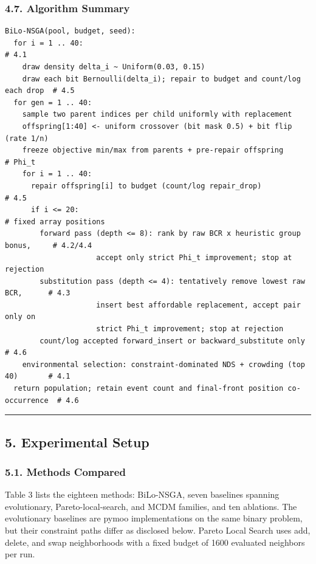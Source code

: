 \documentclass[
]{article}
\begin{document}
\subsubsection{4.7. Algorithm Summary}\label{algorithm-summary}

\begin{verbatim}
BiLo-NSGA(pool, budget, seed):
  for i = 1 .. 40:                                                             # 4.1
    draw density delta_i ~ Uniform(0.03, 0.15)
    draw each bit Bernoulli(delta_i); repair to budget and count/log each drop  # 4.5
  for gen = 1 .. 40:
    sample two parent indices per child uniformly with replacement
    offspring[1:40] <- uniform crossover (bit mask 0.5) + bit flip (rate 1/n)
    freeze objective min/max from parents + pre-repair offspring                # Phi_t
    for i = 1 .. 40:
      repair offspring[i] to budget (count/log repair_drop)                     # 4.5
      if i <= 20:                                                               # fixed array positions
        forward pass (depth <= 8): rank by raw BCR x heuristic group bonus,     # 4.2/4.4
                     accept only strict Phi_t improvement; stop at rejection
        substitution pass (depth <= 4): tentatively remove lowest raw BCR,      # 4.3
                     insert best affordable replacement, accept pair only on
                     strict Phi_t improvement; stop at rejection
        count/log accepted forward_insert or backward_substitute only           # 4.6
    environmental selection: constraint-dominated NDS + crowding (top 40)       # 4.1
  return population; retain event count and final-front position co-occurrence  # 4.6
\end{verbatim}

\begin{center}\rule{0.5\linewidth}{0.5pt}\end{center}

\subsection{5. Experimental Setup}\label{experimental-setup}

\subsubsection{5.1. Methods Compared}\label{methods-compared}

Table 3 lists the eighteen methods: BiLo-NSGA, seven baselines spanning evolutionary, Pareto-local-search, and MCDM families, and ten ablations. The evolutionary baselines are pymoo implementations on the same binary problem, but their constraint paths differ as disclosed below. Pareto Local Search uses add, delete, and swap neighborhoods with a fixed budget of 1600 evaluated neighbors per run.
\end{document}
